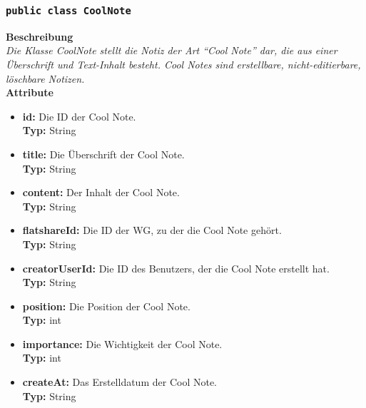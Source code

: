 \subsubsection{\texttt{public class CoolNote}}

	\textbf{Beschreibung} \\
	\textit{Die Klasse CoolNote stellt die Notiz der Art “Cool Note” dar, die aus einer Überschrift und Text-Inhalt besteht. Cool Notes sind erstellbare, nicht-editierbare, löschbare Notizen.} \\
	
	\textbf{Attribute}
	\begin{itemize}
		\item \textbf{id:} Die ID der Cool Note. \\
		\textbf{Typ:} String
		\item \textbf{title:} Die Überschrift der Cool Note. \\
		\textbf{Typ:} String
		\item \textbf{content:} Der Inhalt der Cool Note. \\
		\textbf{Typ:} String
		\item \textbf{flatshareId:} Die ID der WG, zu der die Cool Note gehört. \\
		\textbf{Typ:} String
		\item \textbf{creatorUserId:} Die ID des Benutzers, der die Cool Note erstellt hat. \\
		\textbf{Typ:} String
		\item \textbf{position:} Die Position der Cool Note. \\
		\textbf{Typ:} int
		\item \textbf{importance:} Die Wichtigkeit der Cool Note. \\
		\textbf{Typ:} int
		\item \textbf{createAt:} Das Erstelldatum der Cool Note.\\
		\textbf{Typ:} String
	\end{itemize}

